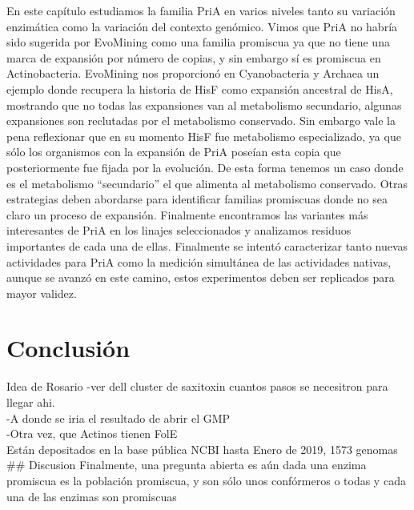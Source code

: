 \documentclass[12pt,twoside]{reedthesis}
\begin{document}
  En este capítulo estudiamos la familia PriA en varios niveles tanto su
  variación enzimática como la variación del contexto genómico. Vimos que
  PriA no habría sido sugerida por EvoMining como una familia promiscua ya
  que no tiene una marca de expansión por número de copias, y sin embargo
  sí es promiscua en Actinobacteria. EvoMining nos proporcionó en
  Cyanobacteria y Archaea un ejemplo donde recupera la historia de HisF
  como expansión ancestral de HisA, mostrando que no todas las expansiones
  van al metabolismo secundario, algunas expansiones son reclutadas por el
  metabolismo conservado. Sin embargo vale la pena reflexionar que en su
  momento HisF fue metabolismo especializado, ya que sólo los organismos
  con la expansión de PriA poseían esta copia que posteriormente fue
  fijada por la evolución. De esta forma tenemos un caso donde es el
  metabolismo ``secundario'' el que alimenta al metabolismo conservado.
  Otras estrategias deben abordarse para identificar familias promiscuas
  donde no sea claro un proceso de expansión. Finalmente encontramos las
  variantes más interesantes de PriA en los linajes seleccionados y
  analizamos residuos importantes de cada una de ellas. Finalmente se
  intentó caracterizar tanto nuevas actividades para PriA como la medición
  simultánea de las actividades nativas, aunque se avanzó en este camino,
  estos experimentos deben ser replicados para mayor validez.
  
  \chapter*{Conclusión}\label{conclusion}
  
  \setcounter{chapter}{4} \setcounter{section}{0}
  
  Idea de Rosario -ver dell cluster de saxitoxin cuantos pasos se
  necesitron para llegar ahi.\\
  -A donde se iria el resultado de abrir el GMP\\
  -Otra vez, que Actinos tienen FolE\\
  Están depositados en la base pública NCBI hasta Enero de 2019, 1573
  genomas \#\# Discusion Finalmente, una pregunta abierta es aún dada una
  enzima promiscua es la población promiscua, y son sólo unos confórmeros
  o todas y cada una de las enzimas son promiscuas
  
\end{document}
